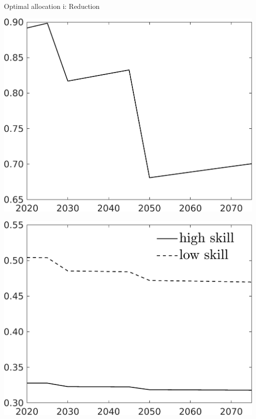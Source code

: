 \documentclass[11pt,aspectratio=169]{beamer}
\begin{document}
\begin{frame}{Optimal allocation i: Reduction}
	\centering
\begin{minipage}[]{0.32\textwidth}
	\includegraphics[width=1\textwidth]{../codding_model/own_basedOnFried/optimalPol_elastS_DisuSci/figures/all_1705/Single_OPT_T_NoTaus_C_spillover0_sep1_BN1_ineq0_red0_etaa0.79.png}
\end{minipage}
	\begin{minipage}[]{0.32\textwidth}
		\includegraphics[width=1\textwidth]{../codding_model/own_basedOnFried/optimalPol_elastS_DisuSci/figures/all_1705/SingleJoint_OPT_T_NoTaus_labour_spillover0_sep1_BN1_ineq0_red0_etaa0.79_lgd1.png}

\end{minipage}
\end{frame}
\end{document}
